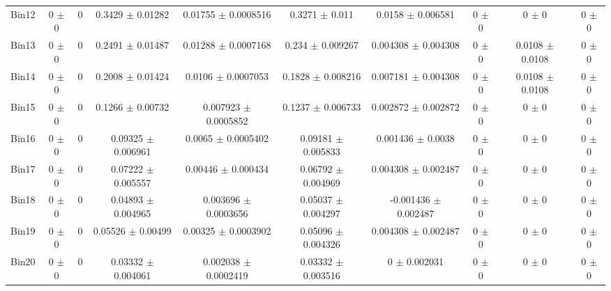 \begin{tabular}{@{\extracolsep{4pt}}lccccccccc@{}}
     Bin12 & 0 $\pm$ 0 & 0 & 0.3429 $\pm$ 0.01282 & 0.01755 $\pm$ 0.0008516 & 0.3271 $\pm$ 0.011 & 0.0158 $\pm$ 0.006581 & 0 $\pm$ 0 & 0 $\pm$ 0 & 0 $\pm$ 0 \\ 
     Bin13 & 0 $\pm$ 0 & 0 & 0.2491 $\pm$ 0.01487 & 0.01288 $\pm$ 0.0007168 & 0.234 $\pm$ 0.009267 & 0.004308 $\pm$ 0.004308 & 0 $\pm$ 0 & 0.0108 $\pm$ 0.0108 & 0 $\pm$ 0 \\ 
     Bin14 & 0 $\pm$ 0 & 0 & 0.2008 $\pm$ 0.01424 & 0.0106 $\pm$ 0.0007053 & 0.1828 $\pm$ 0.008216 & 0.007181 $\pm$ 0.004308 & 0 $\pm$ 0 & 0.0108 $\pm$ 0.0108 & 0 $\pm$ 0 \\ 
     Bin15 & 0 $\pm$ 0 & 0 & 0.1266 $\pm$ 0.00732 & 0.007923 $\pm$ 0.0005852 & 0.1237 $\pm$ 0.006733 & 0.002872 $\pm$ 0.002872 & 0 $\pm$ 0 & 0 $\pm$ 0 & 0 $\pm$ 0 \\ 
     Bin16 & 0 $\pm$ 0 & 0 & 0.09325 $\pm$ 0.006961 & 0.0065 $\pm$ 0.0005402 & 0.09181 $\pm$ 0.005833 & 0.001436 $\pm$ 0.0038 & 0 $\pm$ 0 & 0 $\pm$ 0 & 0 $\pm$ 0 \\ 
     Bin17 & 0 $\pm$ 0 & 0 & 0.07222 $\pm$ 0.005557 & 0.00446 $\pm$ 0.000434 & 0.06792 $\pm$ 0.004969 & 0.004308 $\pm$ 0.002487 & 0 $\pm$ 0 & 0 $\pm$ 0 & 0 $\pm$ 0 \\ 
     Bin18 & 0 $\pm$ 0 & 0 & 0.04893 $\pm$ 0.004965 & 0.003696 $\pm$ 0.0003656 & 0.05037 $\pm$ 0.004297 & -0.001436 $\pm$ 0.002487 & 0 $\pm$ 0 & 0 $\pm$ 0 & 0 $\pm$ 0 \\ 
     Bin19 & 0 $\pm$ 0 & 0 & 0.05526 $\pm$ 0.00499 & 0.00325 $\pm$ 0.0003902 & 0.05096 $\pm$ 0.004326 & 0.004308 $\pm$ 0.002487 & 0 $\pm$ 0 & 0 $\pm$ 0 & 0 $\pm$ 0 \\ 
     Bin20 & 0 $\pm$ 0 & 0 & 0.03332 $\pm$ 0.004061 & 0.002038 $\pm$ 0.0002419 & 0.03332 $\pm$ 0.003516 & 0 $\pm$ 0.002031 & 0 $\pm$ 0 & 0 $\pm$ 0 & 0 $\pm$ 0 \\ 
\hline\hline
  \end{tabular}
